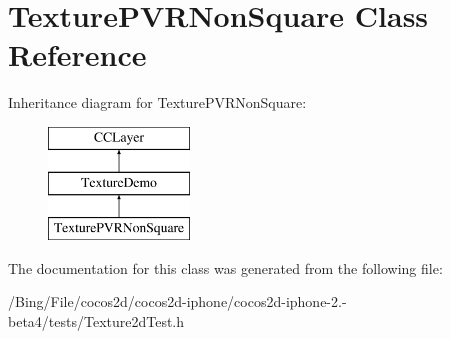 \hypertarget{interface_texture_p_v_r_non_square}{\section{Texture\-P\-V\-R\-Non\-Square Class Reference}
\label{interface_texture_p_v_r_non_square}
}
Inheritance diagram for Texture\-P\-V\-R\-Non\-Square\-:\begin{figure}[H]
\begin{center}
\leavevmode
\includegraphics[height=3.000000cm]{interface_texture_p_v_r_non_square}
\end{center}
\end{figure}


The documentation for this class was generated from the following file\-:\begin{DoxyCompactItemize}
\item 
/\-Bing/\-File/cocos2d/cocos2d-\/iphone/cocos2d-\/iphone-\/2.-\/beta4/tests/Texture2d\-Test.\-h\end{DoxyCompactItemize}
